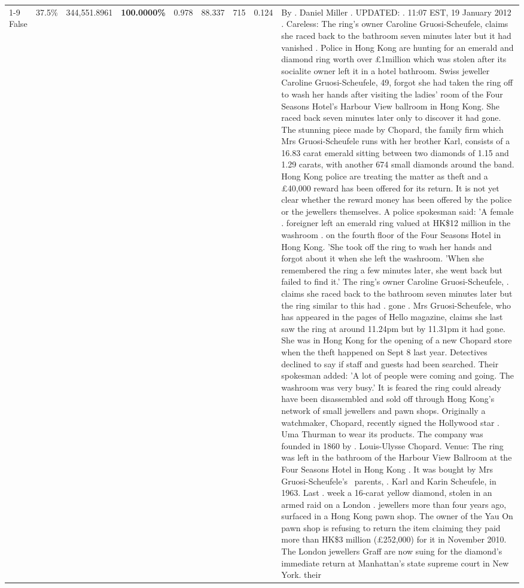 \begin{table}[H]
\begin{tabular}{lllrlllll}
\cline{1-9} \cline{2-9}
False & 37.5\% & 344,551.8961 & \bfseries \color{red} 100.0000\% & 0.978 & 88.337 & 715 & 0.124 & By . Daniel Miller . UPDATED: . 11:07 EST, 19 January 2012 . Careless: The ring's owner Caroline Gruosi-Scheufele, claims she raced back to the bathroom seven minutes later but it had vanished . Police in Hong Kong are hunting for an emerald and diamond ring worth over £1million which was stolen after its socialite owner left it in a hotel bathroom. Swiss jeweller Caroline Gruosi-Scheufele, 49, forgot she had taken the ring off to wash her hands after visiting the ladies' room of the Four Seasons Hotel's Harbour View ballroom in Hong Kong. She raced back seven minutes later only to discover it had gone. The stunning piece made by Chopard, the family firm which Mrs Gruosi-Scheufele runs with her brother Karl, consists of a 16.83 carat emerald sitting between two diamonds of 1.15 and 1.29 carats, with another 674 small diamonds around the band. Hong Kong police are treating the matter as theft and a £40,000 reward has been offered for its return. It is not yet clear whether the reward money has been offered by the police or the jewellers themselves. A police spokesman said: 'A female . foreigner left an emerald ring valued at HK\$12 million in the washroom . on the fourth floor of the Four Seasons Hotel in Hong Kong. 'She took off the ring to wash her hands and forgot about it when she left the washroom. 'When she remembered the ring a few minutes later, she went back but failed to find it.' The ring's owner Caroline Gruosi-Scheufele, . claims she raced back to the bathroom seven minutes later but the ring similar to this had . gone . Mrs Gruosi-Scheufele, who has appeared in the pages of Hello magazine, claims she last saw the ring at around 11.24pm but by 11.31pm it had gone. She was in Hong Kong for the opening of a new Chopard store when the theft happened on Sept 8 last year. Detectives declined to say if staff and guests had been searched. Their spokesman added: 'A lot of people were coming and going. The washroom was very busy.' It is feared the ring could already have been disassembled and sold off through Hong Kong's network of small jewellers and pawn shops. Originally a watchmaker, Chopard, recently signed the Hollywood star . Uma Thurman to wear its products. The company was founded in 1860 by . Louis-Ulysse Chopard. Venue: The ring was left in the bathroom of the Harbour View Ballroom at the Four Seasons Hotel in Hong Kong . It was bought by Mrs Gruosi-Scheufele's  parents, . Karl and Karin Scheufele, in 1963. Last . week a 16-carat yellow diamond, stolen in an armed raid on a London . jewellers more than four years ago, surfaced in a Hong Kong pawn shop. The owner of the Yau On pawn shop is refusing to return the item claiming they paid more than HK\$3 million (£252,000) for it in November 2010. The London jewellers Graff are now suing for the diamond’s immediate return at Manhattan’s state supreme court in New York. their \\

\end{tabular}
\end{table}

